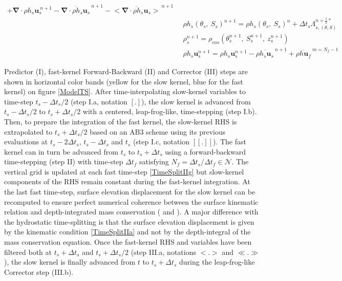 \begin{table}
\begin{subequations}
\begin{alignat}{3}
 +\mathbf{\nabla}\cdot\rho h_s \mathbf{u}_s^{\ n+1}
 -\overline{\mathbf{\nabla}\cdot\rho h_s \mathbf{u}_s}^{\ n+1}
 -\overline{<\mathbf{\nabla}\cdot\rho h_s \mathbf{u}_s>}^{\ n+1}\\[2mm]
 \label{TimeSplitIIIb3}
 &\enspace\rho h_s(\theta_s,\ S_s)^{n+1}=
 \rho h_s(\theta_s,\ S_s)^{n}
 +\Delta t_s\Lambda_{s,(\theta,S)}^{n+\frac{1}{2}*}\\[0mm]
 \label{TimeSplitIIIb4}
 &\enspace\rho_s^{n+1}=\rho_{eos}\left(\theta_s^{n+1},\ S_s^{n+1},\ z_s^{n+1}\right)\\[0mm]
 \label{TimeSplitIIIb5}
 &\enspace\rho h_s\mathbf{u}_s^{n+1}=\rho h_s\mathbf{u}_s^{n+1}
 -\overline{\rho h_s\mathbf{u}_s}^{\ n+1}
 +\overline{\rho h\mathbf{u}_f}^{\ m=N_f-1}
\end{alignat}
\end{subequations}
\end{table}
Predictor (I), fast-kernel Forward-Backward (II) and Corrector (III) steps are shown in horizontal color bands (yellow for the slow kernel, blue for the fast kernel) on figure \ref{ModelTS}. After time-interpolating slow-kernel variables to time-step $t_s-\Delta t_s/2$ (step I.a, notation $[.]$), the slow kernel is advanced from $t_s-\Delta t_s/2$ to $t_s+\Delta t_s/2$ with a centered, leap-frog-like, time-stepping (step I.b). Then, to prepare the integration of the fast kernel, the slow-kernel RHS is extrapolated to $t_s+\Delta t_s/2$ based on an AB3 scheme using its previous evaluations at $t_s-2\Delta t_s$, $t_s-\Delta t_s$ and $t_s$ (step I.c, notation $[[.]]$). The fast kernel can in turn be advanced from $t_s$ to $t_s+\Delta t_s$ using a forward-backward time-stepping (step II) with time-step $\Delta t_f$ satisfying  $N_f=\Delta t_s/\Delta t_f\in\mathcal{N}$. The vertical grid is updated at each fast time-step \ref{TimeSplitIIg} but slow-kernel components of the RHS remain constant during the fast-kernel integration. At the last fast time-step, surface elevation displacement for the slow kernel can be recomputed to ensure perfect numerical coherence between the surface kinematic relation and depth-integrated mass conservation ( and ). 
A major difference with the hydrostatic time-splitting is that the surface elevation displacement is given by the kinematic condition \ref{TimeSplitIIa} and not by the depth-integral of the mass conservation equation. Once the fast-kernel RHS and variables have been filtered both at $t_s+\Delta t_s$ and $t_s+\Delta t_s/2$ (step III.a, notations $<.>$ and $\ll.\gg$), the slow kernel is finally advanced from $t$ to  $t_s+\Delta t_s$ during the leap-frog-like Corrector step (III.b).\\

